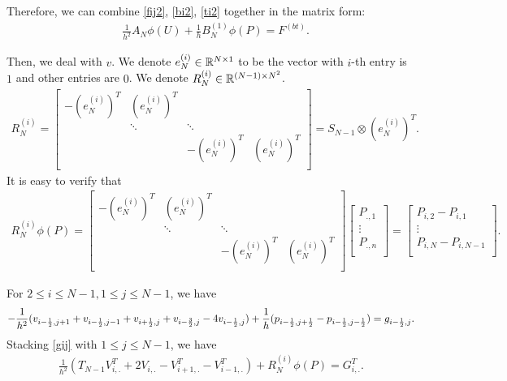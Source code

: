 \documentclass[english]{pkupaper}
\newenvironment{eqt}{\begin{equation}\begin{aligned}}{\end{aligned}\end{equation}}
\begin{document}
Therefore, we can combine \ref{fij2}, \ref{bi2}, \ref{ti2} together in the matrix form:
\begin{eqt}
\label{u1}
&\frac{1}{h^2}
A_N\phi(U)+\frac{1}{h}
B_N^{(1)}\phi(P)=F^{(bt)}.
\end{eqt}


Then, we deal with $v$. We denote $e^{(i)}_N\in \mathbb{R}^{N\times 1}$ to be the vector with $i$-th entry is $1$ and other entries are $0$. We denote $R_N^{(i)}\in \mathbb{R}^{(N-1)\times N^2}$.
\begin{eqt}
\label{rni}
R_N^{(i)}=\begin{bmatrix}
-(e_{N}^{(i)})^T & (e_{N}^{(i)})^T\\
&\ddots&\ddots\\
&&-(e_{N}^{(i)})^T & (e_{N}^{(i)})^T\\
\end{bmatrix}=S_{N-1}\otimes(e_{N}^{(i)})^T.
\end{eqt}
It is easy to verify that 
\begin{eqt}
R_N^{(i)}\phi(P)=\begin{bmatrix}
-(e_{N}^{(i)})^T & (e_{N}^{(i)})^T\\
&\ddots&\ddots\\
&&-(e_{N}^{(i)})^T & (e_{N}^{(i)})^T\\
\end{bmatrix}
\begin{bmatrix}
P_{.,1}\\
\vdots\\
P_{.,n}\\
\end{bmatrix}
=\begin{bmatrix}
P_{i,2}-P_{i,1}\\
\vdots\\
P_{i,N}-P_{i,N-1}\\
\end{bmatrix}.
\end{eqt}

For $2\leq i \leq N-1, 1\leq j\leq N-1$, we have 
\begin{equation}
\label{gij}
-\frac{1}{h^2}(v_{i-\frac{1}{2},j+1}+v_{i-\frac{1}{2},j-1}+v_{i+\frac{1}{2},j}+v_{i-\frac{3}{2},j}-4v_{i-\frac{1}{2},j})+\frac{1}{h}(p_{i-\frac{1}{2},j+\frac{1}{2}}-p_{i-\frac{1}{2},j-\frac{1}{2}})=g_{i-\frac{1}{2},j}.
\end{equation}
Stacking \ref{gij} with $1\leq j\leq N-1$, we have
\begin{eqt}
\label{gij2}
\frac{1}{h^2}\left(T_{N-1}V_{i,.}^T+2V_{i,.}-V_{i+1,.}^T-V_{i-1,.}^T\right)+R_N^{(i)}\phi(P)=G_{i,.}^T.
\end{eqt}
\end{document}
